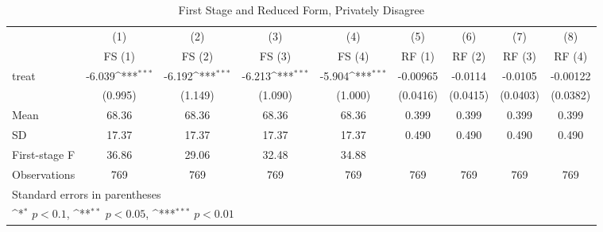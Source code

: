 \begin{table}[htbp]\centering
\def\sym#1{\ifmmode^{#1}\else\(^{#1}\)\fi}
\caption{First Stage and Reduced Form, Privately Disagree}
\begin{tabular}{l*{8}{c}}
\hline\hline
                      &\multicolumn{1}{c}{(1)}&\multicolumn{1}{c}{(2)}&\multicolumn{1}{c}{(3)}&\multicolumn{1}{c}{(4)}&\multicolumn{1}{c}{(5)}&\multicolumn{1}{c}{(6)}&\multicolumn{1}{c}{(7)}&\multicolumn{1}{c}{(8)}\\
                      &\multicolumn{1}{c}{FS (1)}&\multicolumn{1}{c}{FS (2)}&\multicolumn{1}{c}{FS (3)}&\multicolumn{1}{c}{FS (4)}&\multicolumn{1}{c}{RF (1)}&\multicolumn{1}{c}{RF (2)}&\multicolumn{1}{c}{RF (3)}&\multicolumn{1}{c}{RF (4)}\\
\hline
treat                 &   -6.039\sym{***}&   -6.192\sym{***}&   -6.213\sym{***}&   -5.904\sym{***}& -0.00965         &  -0.0114         &  -0.0105         & -0.00122         \\
                      &  (0.995)         &  (1.149)         &  (1.090)         &  (1.000)         & (0.0416)         & (0.0415)         & (0.0403)         & (0.0382)         \\
\hline
Mean                  &    68.36         &    68.36         &    68.36         &    68.36         &    0.399         &    0.399         &    0.399         &    0.399         \\
SD                    &    17.37         &    17.37         &    17.37         &    17.37         &    0.490         &    0.490         &    0.490         &    0.490         \\
First-stage F         &    36.86         &    29.06         &    32.48         &    34.88         &                  &                  &                  &                  \\
Observations          &      769         &      769         &      769         &      769         &      769         &      769         &      769         &      769         \\
\hline\hline
\multicolumn{9}{l}{\footnotesize Standard errors in parentheses}\\
\multicolumn{9}{l}{\footnotesize \sym{*} \(p<0.1\), \sym{**} \(p<0.05\), \sym{***} \(p<0.01\)}\\
\end{tabular}
\end{table}
